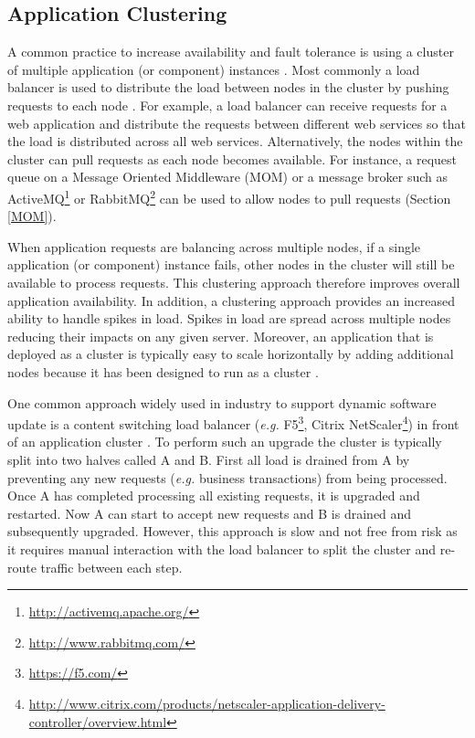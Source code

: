\documentclass[a4paper,11pt,twoside]{report}
\begin{document}
\subsection{Application Clustering}
A common practice to increase availability and fault tolerance is using a cluster of multiple application (or component) instances \cite{Clustring}. Most commonly a load balancer is used to distribute the load between nodes in the cluster by pushing requests to each node \cite{balancer}. For example, a load balancer can receive requests for a web application and distribute the requests between different web services so that the load is distributed across all web services. Alternatively, the nodes within the cluster can pull requests as each node becomes available. For instance, a request queue on a Message Oriented Middleware (MOM) or a message broker such as ActiveMQ\footnote{\url{http://activemq.apache.org/}} or RabbitMQ\footnote{ \url{http://www.rabbitmq.com/}} can be used to allow nodes to pull requests (Section \ref{MOM}).

When application requests are balancing across multiple nodes, if a single application (or component) instance fails, other nodes in the cluster will still be available to process requests. This clustering approach therefore improves overall application availability. In addition, a clustering approach provides an increased ability to handle spikes in load. Spikes in load are spread across multiple nodes reducing their impacts on any given server. Moreover, an application that is deployed as a cluster is typically easy to scale horizontally by adding additional nodes because it has been designed to run as a cluster \cite{Clustring}.

One common approach widely used in industry to support dynamic software update is a content switching load balancer (\textit{e.g.} F5\footnote{\url{https://f5.com/}}, Citrix  NetScaler\footnote{\url{http://www.citrix.com/products/netscaler-application-delivery-controller/overview.html}}) in front of an application cluster \cite{balancer}. To perform such an upgrade the cluster is typically split into two halves called A and B. First all load is drained from A by preventing any new requests (\textit{e.g.} business transactions) from being processed. Once A has completed processing all existing requests, it is upgraded and restarted. Now A can start to accept new requests and B is drained and subsequently upgraded. However, this approach is slow and not free from risk as it requires manual interaction with the load balancer to split the cluster and re-route traffic between each step.
\end{document}
